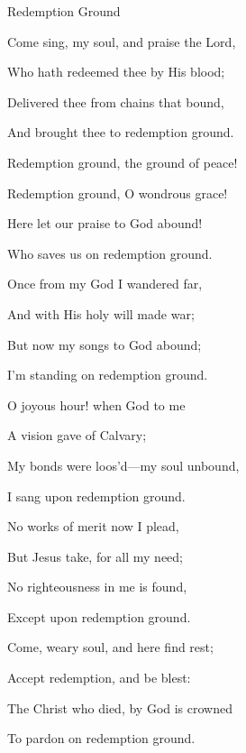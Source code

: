 \documentclass[12pt]{book}
\begin{document}
\begin{song}{Redemption Ground}{}
  {\SBPubDom}
  {}
  {}
  {}

  \begin{SBVerse}
    Come sing, my soul, and praise the Lord,

    Who hath redeemed thee by His blood;

    Delivered thee from chains that bound,

    And brought thee to redemption ground.
  \end{SBVerse}

  \begin{SBOpGroup}
    Redemption ground, the ground of peace!

    Redemption ground, O wondrous grace!

    Here let our praise to God abound!

    Who saves us on redemption ground.
  \end{SBOpGroup}

  \begin{SBVerse}
    Once from my God I wandered far,

    And with His holy will made war;

    But now my songs to God abound;

    I'm standing on redemption ground.
  \end{SBVerse}

  \begin{SBVerse}
    O joyous hour! when God to me

    A vision gave of Calvary;

    My bonds were loos'd---my soul unbound,

    I sang upon redemption ground.
  \end{SBVerse}

  \begin{SBVerse}
    No works of merit now I plead,

    But Jesus take, for all my need;

    No righteousness in me is found,

    Except upon redemption ground.
  \end{SBVerse}

  \begin{SBVerse}
    Come, weary soul, and here find rest;

    Accept redemption, and be blest:

    The Christ who died, by God is crowned

    To pardon on redemption ground.
  \end{SBVerse}
\end{song}
\end{document}
